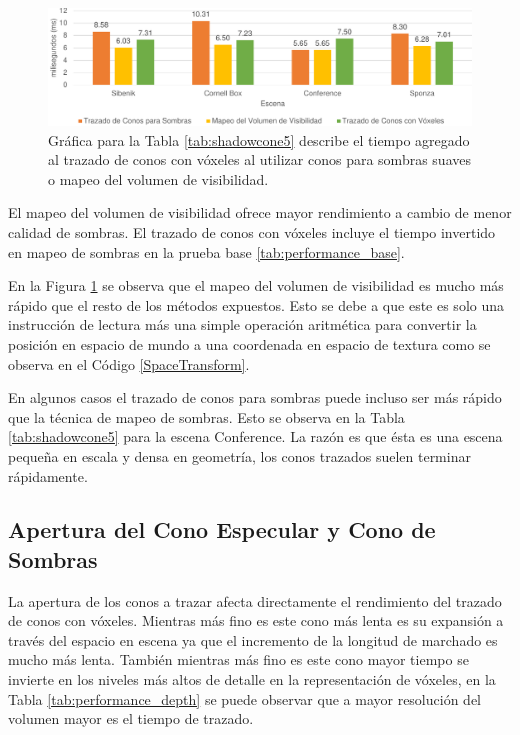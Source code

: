 \begin{figure}[H]
	\centering
	\includegraphics[width=0.95\linewidth]{media/shadowtrace_time_cropped.pdf}
	\caption{Gráfica para la Tabla \ref{tab:shadowcone5} describe el tiempo agregado al trazado de conos con vóxeles al utilizar conos para sombras suaves o mapeo del volumen de visibilidad.}
	\label{fig:voxeltrace_shadowing}
\end{figure}

El mapeo del volumen de visibilidad ofrece mayor rendimiento a cambio de menor calidad de sombras. El trazado de conos con vóxeles incluye el tiempo invertido en mapeo de sombras en la prueba base \ref{tab:performance_base}. 

En la Figura \ref{fig:voxeltrace_shadowing} se observa que el mapeo del volumen de visibilidad es mucho más rápido que el resto de los métodos expuestos. Esto se debe a que este es solo una instrucción de lectura más una simple operación aritmética para convertir la posición en espacio de mundo a una coordenada en espacio de textura como se observa en el Código \ref{SpaceTransform}. 

En algunos casos el trazado de conos para sombras puede incluso ser más rápido que la técnica de mapeo de sombras. Esto se observa en la Tabla \ref{tab:shadowcone5} para la escena Conference. La razón es que ésta es una escena pequeña en escala y densa en geometría, los conos trazados suelen terminar rápidamente.

\subsection{Apertura del Cono Especular y Cono de Sombras}

La apertura de los conos a trazar afecta directamente el rendimiento del trazado de conos con vóxeles. Mientras más fino es este cono más lenta es su expansión a través del espacio en escena ya que el incremento de la longitud de marchado es mucho más lenta. También mientras más fino es este cono mayor tiempo se invierte en los niveles más altos de detalle en la representación de vóxeles, en la Tabla \ref{tab:performance_depth} se puede observar que a mayor resolución del volumen mayor es el tiempo de trazado.

